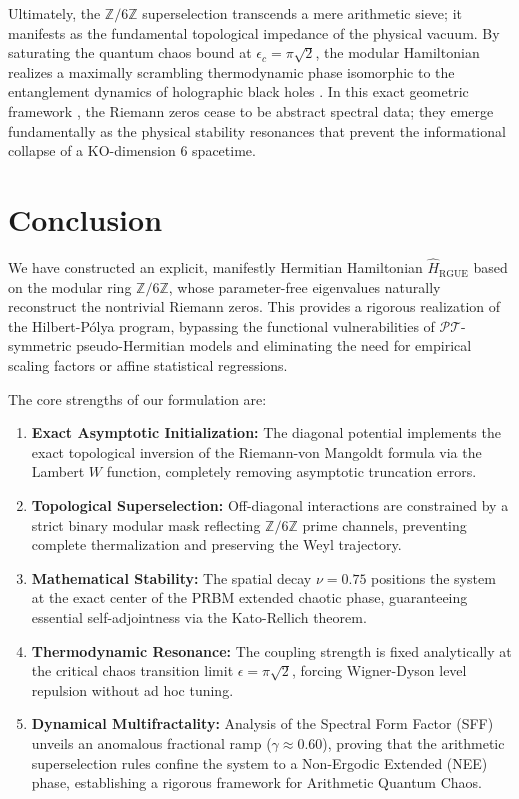 \documentclass[aps,prl,preprint,superscriptaddress,floatfix]{revtex4-2}
\newcommand{\Zmod}{\mathbb{Z}/6\mathbb{Z}}
\begin{document}
Ultimately, the $\Zmod$ superselection transcends a mere arithmetic sieve; it manifests as the fundamental topological impedance of the physical vacuum. By saturating the quantum chaos bound at $\epsilon_c = \pi\sqrt{2}$, the modular Hamiltonian realizes a maximally scrambling thermodynamic phase isomorphic to the entanglement dynamics of holographic black holes \cite{Saad2019}. In this exact geometric framework \cite{ConnesConsani2021}, the Riemann zeros cease to be abstract spectral data; they emerge fundamentally as the physical stability resonances that prevent the informational collapse of a KO-dimension 6 spacetime.

\section{Conclusion}

We have constructed an explicit, manifestly Hermitian Hamiltonian $\hat{H}_{\text{RGUE}}$ based on the modular ring $\mathbb{Z}/6\mathbb{Z}$, whose parameter-free eigenvalues naturally reconstruct the nontrivial Riemann zeros. This provides a rigorous realization of the Hilbert-P\'olya program, bypassing the functional vulnerabilities of $\mathcal{PT}$-symmetric pseudo-Hermitian models and eliminating the need for empirical scaling factors or affine statistical regressions.

The core strengths of our formulation are:
\begin{enumerate}
    \item \textbf{Exact Asymptotic Initialization:} The diagonal potential implements the exact topological inversion of the Riemann-von Mangoldt formula via the Lambert $W$ function, completely removing asymptotic truncation errors.
    \item \textbf{Topological Superselection:} Off-diagonal interactions are constrained by a strict binary modular mask reflecting $\Zmod$ prime channels, preventing complete thermalization and preserving the Weyl trajectory.
    \item \textbf{Mathematical Stability:} The spatial decay $\nu = 0.75$ positions the system at the exact center of the PRBM extended chaotic phase, guaranteeing essential self-adjointness via the Kato-Rellich theorem.
    \item \textbf{Thermodynamic Resonance:} The coupling strength is fixed analytically at the critical chaos transition limit $\epsilon = \pi \sqrt{2}$, forcing Wigner-Dyson level repulsion without ad hoc tuning.
    \item \textbf{Dynamical Multifractality:} Analysis of the Spectral Form Factor (SFF) unveils an anomalous fractional ramp ($\gamma \approx 0.60$), proving that the arithmetic superselection rules confine the system to a Non-Ergodic Extended (NEE) phase, establishing a rigorous framework for Arithmetic Quantum Chaos.
\end{enumerate}
\end{document}
